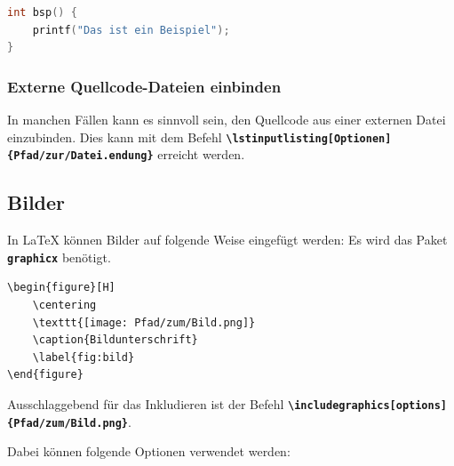 \begin{lstlisting}[language=C, caption=Beispielcode, label=scr:beispiel]
int bsp() {
    printf("Das ist ein Beispiel");
}   
\end{lstlisting}

\subsubsection{Externe Quellcode-Dateien einbinden}
In manchen Fällen kann es sinnvoll sein, den Quellcode aus einer externen Datei einzubinden. Dies kann mit dem Befehl \textbf{\texttt{\textbackslash lstinputlisting[Optionen]\{Pfad/zur/Datei.endung\}}} erreicht werden.



\subsection{Bilder}
In \LaTeX{} können Bilder auf folgende Weise eingefügt werden:
Es wird das Paket \textbf{\texttt{graphicx}} benötigt.

\begin{lstlisting}[language={[LaTeX]TeX}]
\begin{figure}[H]
    \centering
    \texttt{[image: Pfad/zum/Bild.png]}
    \caption{Bildunterschrift}
    \label{fig:bild}
\end{figure}
\end{lstlisting}

Ausschlaggebend für das Inkludieren ist der Befehl \textbf{\texttt{\textbackslash includegraphics[options]\{Pfad/zum/Bild.png\}}}.

Dabei können folgende Optionen verwendet werden:

